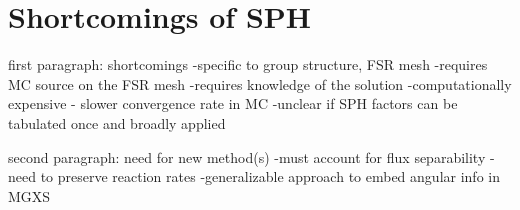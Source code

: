 

\section{Shortcomings of SPH}
\label{subsec:chap6-sph-shortcomings}

first paragraph: shortcomings
-specific to group structure, FSR mesh
-requires MC source on the FSR mesh
  -requires knowledge of the solution
-computationally expensive - slower convergence rate in MC
-unclear if SPH factors can be tabulated once and broadly applied

second paragraph: need for new method(s)
-must account for flux separability
-need to preserve reaction rates
-generalizable approach to embed angular info in MGXS